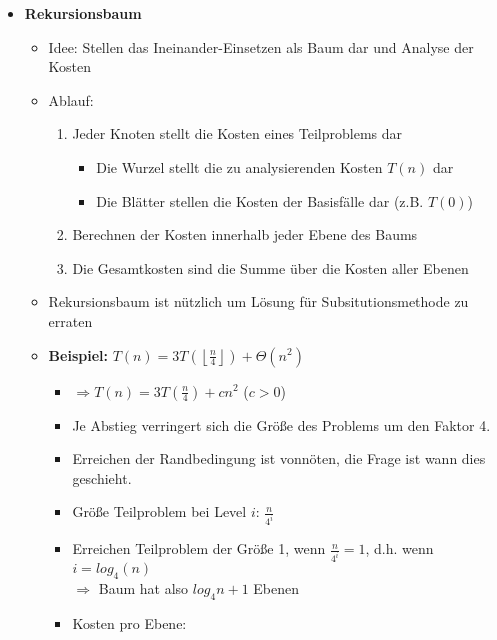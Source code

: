 \begin{itemize}
        \item \textbf{Rekursionsbaum}
            \begin{itemize}
                \item Idee: Stellen das Ineinander-Einsetzen als Baum dar und Analyse der Kosten
                \item Ablauf:
                    \begin{enumerate}
                        \item Jeder Knoten stellt die Kosten eines Teilproblems dar 
                            \begin{itemize}
                                \item Die Wurzel stellt die zu analysierenden Kosten $T(n)$ dar 
                                \item Die Blätter stellen die Kosten der Basisfälle dar (z.B. $T(0)$)
                            \end{itemize}
                        \item Berechnen der Kosten innerhalb jeder Ebene des Baums
                        \item Die Gesamtkosten sind die Summe über die Kosten aller Ebenen
                    \end{enumerate}
                \item Rekursionsbaum ist nützlich um Lösung für Subsitutionsmethode zu erraten 
                \item \textbf{Beispiel:} $T(n) = 3T(\left \lfloor \frac{n}{4} \right \rfloor) + \Theta(n^2)$
                    \begin{itemize}
                        \item $\Rightarrow T(n) = 3T(\frac{n}{4}) + cn^2$ ($c>0$)
                        \item Je Abstieg verringert sich die Größe des Problems um den Faktor 4. 
                        \item Erreichen der Randbedingung ist vonnöten, die Frage ist wann dies geschieht.
                        \item Größe Teilproblem bei Level $i$: $\frac{n}{4^i}$
                        \item Erreichen Teilproblem der Größe 1, wenn $\frac{n}{4^i}=1$, d.h. wenn $i=log_4(n)$ \\
                            $\Rightarrow$ Baum hat also $log_4n + 1$ Ebenen
                        \item Kosten pro Ebene:
                            \begin{itemize}

\end{itemize}
\end{itemize}
\end{itemize}
\end{itemize}
